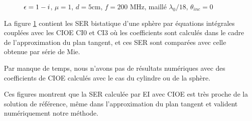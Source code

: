   \FloatBarrier

  \begin{figure}[!hbt]
    \centering
    
    \caption[SER bistatique d'une sphère calculée par un code EI]{\(\epsilon = 1 - i\), \(\mu = 1\), \(d = 5\)cm, \( f =  200\) MHz, maillé \(\lambda_0/18\), \(\theta_{inc}=0\)}
    \label{fig:ser:sphere-bis-M1}
  \end{figure}

  La figure \ref{fig:ser:sphere-bis-M1} contient les SER bistatique d'une sphère par équations intégrales couplées avec les CIOE CI0 et CI3 où les coefficients sont calculés dans le cadre de l'approximation du plan tangent, et ces SER sont comparées avec celle obtenue par série de Mie.

  Par manque de temps, nous n'avons pas de résultats numériques avec des coefficients de CIOE calculés avec le cas du cylindre ou de la sphère.

  Ces figures montrent que la SER calculée par EI avec CIOE est très proche de la solution de référence, même dans l'approximation du plan tangent et valident numériquement notre méthode.

  \FloatBarrier